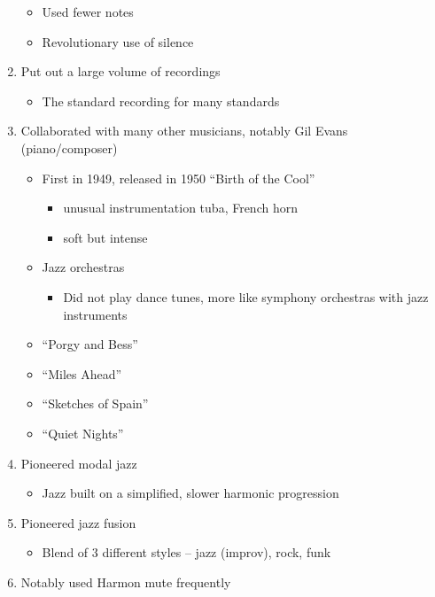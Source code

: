 \documentclass[]{article}
\providecommand{\tightlist}{%
  \setlength{\itemsep}{0pt}\setlength{\parskip}{0pt}}
\begin{document}
\begin{enumerate}
  \begin{itemize}
  \tightlist
  \item
    Used fewer notes
  \item
    Revolutionary use of silence
  \end{itemize}
\item
  Put out a large volume of recordings

  \begin{itemize}
  \tightlist
  \item
    The standard recording for many standards
  \end{itemize}
\item
  Collaborated with many other musicians, notably Gil Evans
  (piano/composer)

  \begin{itemize}
  \tightlist
  \item
    First in 1949, released in 1950 ``Birth of the Cool''

    \begin{itemize}
    \tightlist
    \item
      unusual instrumentation tuba, French horn
    \item
      soft but intense
    \end{itemize}
  \item
    Jazz orchestras

    \begin{itemize}
    \tightlist
    \item
      Did not play dance tunes, more like symphony orchestras with jazz
      instruments
    \end{itemize}
  \item
    ``Porgy and Bess''
  \item
    ``Miles Ahead''
  \item
    ``Sketches of Spain''
  \item
    ``Quiet Nights''
  \end{itemize}
\item
  Pioneered modal jazz

  \begin{itemize}
  \tightlist
  \item
    Jazz built on a simplified, slower harmonic progression
  \end{itemize}
\item
  Pioneered jazz fusion

  \begin{itemize}
  \tightlist
  \item
    Blend of 3 different styles -- jazz (improv), rock, funk
  \end{itemize}
\item
  Notably used Harmon mute frequently


\end{enumerate}
\end{document}
